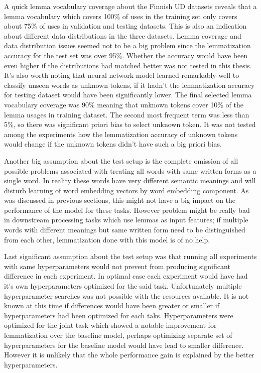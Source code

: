 \documentclass[12pt,a4paper,english
]{tutthesis}
\begin{document}
A quick lemma vocabulary coverage about the Finnish UD datasets reveals that a lemma vocabulary which covers 100\% of uses in the training set only covers about 75\% of uses in validation and testing datasets. This is also an indication about different data distributions in the three datasets. Lemma coverage and data distribution issues seemed not to be a big problem since the lemmatization accuracy for the test set was over 95\%. Whether the accuracy would have been even higher if the distributions had matched better was not tested in this thesis. It's also worth noting that neural network model learned remarkably well to classify unseen words as unknown tokens, if it hadn't the lemmatization accuracy for testing dataset would have been significantly lower. The final selected lemma vocabulary coverage was 90\% meaning that unknown tokens cover 10\% of the lemma usages in training dataset. The second most frequent term was less than 5\%, so there was significant priori bias to select unknown token. It was not tested among the experiments how the lemmatization accuracy of unknown tokens would change if the unknown tokens didn't have such a big priori bias.

Another big assumption about the test setup is the complete omission of all possible problems associated with treating all words with same written forms as a single word. In reality these words have very different semantic meanings and will disturb learning of word embedding vectors by word embedding component. As was discussed in previous sections, this might not have a big impact on the performance of the model for these tasks. However problem might be really bad in downstream processing tasks which use lemmas as input features; if multiple words with different meanings but same written form need to be distinguished from each other, lemmatization done with this model is of no help.

Last significant assumption about the test setup was that running all experiments with same hyperparameters would not prevent from producing significant difference in each experiment. In optimal case each experiment would have had it's own hyperparameters optimized for the said task. Unfortunately multiple hyperparameter searches was not possible with the resources available. It is not known at this time if differences would have been greater or smaller if hyperparameters had been optimized for each taks. Hyperparameters were optimized for the joint task which showed a notable improvement for lemmatization over the baseline model, perhaps optimizing separate set of hyperparameters for the baseline model would have lead to smaller difference. However it is unlikely that the whole performance gain is explained by the better hyperparameters.
\end{document}
